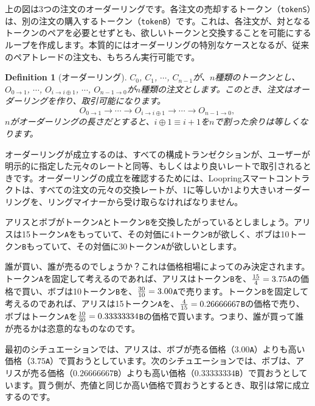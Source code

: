 \documentclass{article}
\newtheorem{definition}{Definition}[section]
\begin{document}
\begin{multicols}{2}
上の図は3つの注文のオーダーリングです。各注文の売却するトークン（\verb|tokenS|）は、別の注文の購入するトークン（\verb|tokenB|）です。これは、各注文が、対となるトークンのペアを必要とせずとも、欲しいトークンと交換することを可能にするループを作成します。本質的にはオーダーリングの特別なケースとなるが、従来のペアトレードの注文も、もちろん実行可能です。

\begin{definition}[オーダーリング] $C_{0}$, $C_{1}$, $\cdots$, $C_{n-1}$が、$n$種類のトークンとし、$O_{0\rightarrow 1}$, $\cdots$, $O_{i\rightarrow i\oplus 1}$, $\cdots$, $O_{n-1 \rightarrow 0}$が$n$種類の注文とします。このとき、注文はオーダーリングを作り、取引可能になります。
$$O_{0\rightarrow 1} \rightarrow \cdots \rightarrow O_{i\rightarrow i\oplus 1} \rightarrow \cdots \rightarrow O_{n-1\rightarrow 0} \text{, }$$
$n$がオーダーリングの長さだとすると、$i\oplus 1 \equiv i+1$を$n$で割った余りは等しくなります。
\end{definition}

オーダーリングが成立するのは、すべての構成トランゼクションが、ユーザーが明示的に指定した元々のレートと同等、もしくはより良いレートで取引されるときです。オーダーリングの成立を確認するためには、Loopringスマートコントラクトは、すべての注文の元々の交換レートが、1に等しいか1より大きいオーダーリングを、リングマイナーから受け取らなければなりません。

アリスとボブがトークン\verb|A|とトークン\verb|B|を交換したがっているとしましょう。アリスは15トークン\verb|A|をもっていて、その対価に4トークン\verb|B|が欲しく、ボブは10トークン\verb|B|もっていて、その対価に30トークン\verb|A|が欲しいとします。

誰が買い、誰が売るのでしょうか？これは価格相場によってのみ決定されます。トークン\verb|A|を固定して考えるのであれば、アリスはトークン\verb|B|を、${15 \over 4} = 3.75$\verb|A|の価格で買い、ボブは10トークン\verb|B|を、${30 \over 10} = 3.00$\verb|A|で売ります。トークン\verb|B|を固定して考えるのであれば、アリスは15トークン\verb|A|を、${4\over 15}=0.26666667$\verb|B|の価格で売り、ボブはトークン\verb|A|を${10 \over 30}=0.33333334$\verb|B|の価格で買います。つまり、誰が買って誰が売るかは恣意的なものなのです。

最初のシチュエーションでは、アリスは、ボブが売る価格（$3.00$\verb|A|）よりも高い価格（$3.75$\verb|A|）で買おうとしています。次のシチュエーションでは、ボブは、アリスが売る価格（$0.26666667$\verb|B|）よりも高い価格（$0.33333334$\verb|B|）で買おうとしています。買う側が、売値と同じか高い価格で買おうとするとき、取引は常に成立するのです。


\end{multicols}
\end{document}
